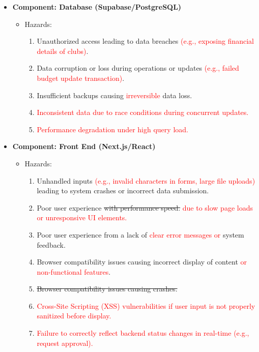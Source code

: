 \documentclass{article}
\begin{document}
\begin{itemize}
    \item \textbf{Component: Database (Supabase/PostgreSQL)} %
    \begin{itemize}
        \item Hazards:
        \begin{enumerate}
            \item Unauthorized access leading to data breaches \textcolor{red}{(e.g., exposing financial details of clubs)}.
            \item Data corruption or loss during operations or updates \textcolor{red}{(e.g., failed budget update transaction)}.
            \item Insufficient backups causing \textcolor{red}{irreversible} data loss.
            \item \textcolor{red}{Inconsistent data due to race conditions during concurrent updates.}
            \item \textcolor{red}{Performance degradation under high query load.}
        \end{enumerate}
    \end{itemize}

    \item \textbf{Component: Front End (Next.js/React)} %
    \begin{itemize}
        \item Hazards:
        \begin{enumerate}
            \item Unhandled inputs \textcolor{red}{(e.g., invalid characters in forms, large file uploads)} leading to system crashes or incorrect data submission.
            \item Poor user experience \sout{with performance speed.} \textcolor{red}{due to slow page loads or unresponsive UI elements.}
            \item Poor user experience from a lack of \textcolor{red}{clear error messages or} system feedback.
            \item Browser compatibility issues causing incorrect display of content \textcolor{red}{or non-functional features}.
            \item \sout{Browser compatibility issues causing crashes.} %
            \item \textcolor{red}{Cross-Site Scripting (XSS) vulnerabilities if user input is not properly sanitized before display.}
            \item \textcolor{red}{Failure to correctly reflect backend status changes in real-time (e.g., request approval).}
        \end{enumerate}
    \end{itemize}


\end{itemize}
\end{document}
